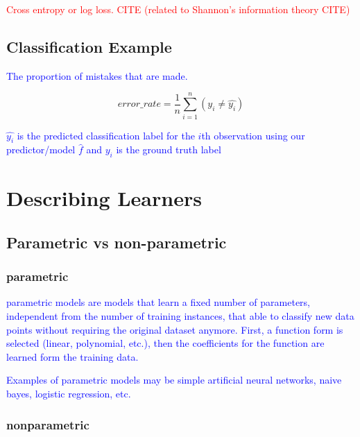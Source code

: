 \textcolor{red}{Cross entropy or log loss. \textcolor{red}{CITE} (related to Shannon's information theory \textcolor{red}{CITE})}



\subsection{Classification Example}

\textcolor{blue}{The proportion of mistakes that are made.}

\begin{equation}
{error\_rate = \frac{1}{n}\sum_{i=1}^{n}(y_i \ne \hat{y_i})}
\label{eq:class_error_rate_def}
\end{equation}

\textcolor{blue}{$\hat{y_i}$ is the predicted classification label for the $i$th observation using our predictor/model $\hat{f}$ and $y_i$ is the ground truth label}

\section{Describing Learners}

\subsection{Parametric vs non-parametric}

\subsubsection{parametric}

\textcolor{blue}{parametric models are models that learn a fixed number of parameters, independent from the number of training instances, that able to classify new data points without requiring the original dataset anymore. First, a function form is selected (linear, polynomial, etc.), then the coefficients for the function are learned form the training data.}
	
\textcolor{blue}{Examples of parametric models may be simple artificial neural networks, naive bayes, logistic regression, etc.}

\subsubsection{nonparametric}

